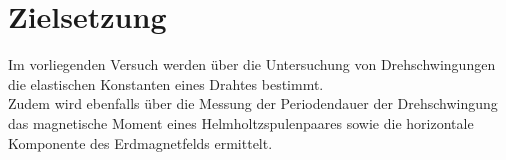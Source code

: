 \section{Zielsetzung}
\label{sec:Zielsetzung}
Im vorliegenden Versuch werden über die Untersuchung von Drehschwingungen die elastischen Konstanten eines Drahtes bestimmt.\\
Zudem wird ebenfalls über die Messung der Periodendauer der Drehschwingung das magnetische Moment eines Helmholtzspulenpaares sowie die horizontale Komponente des Erdmagnetfelds ermittelt.
